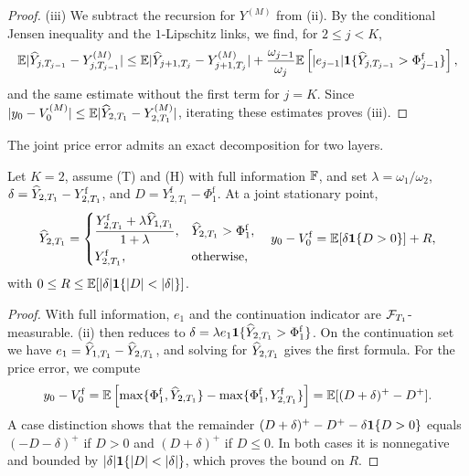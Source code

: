 \begin{proof}
(iii) We subtract the recursion for $Y^{(M)}$ from (ii). By the conditional Jensen inequality and the $1$-Lipschitz links, we find, for $2\le j<K$,
\[
\mathbb{E}\lvert \widehat Y_{j,T_{j-1}}-Y^{(M)}_{j,T_{j-1}}\rvert\le\mathbb{E}\lvert \widehat Y_{j+1,T_j}-Y^{(M)}_{j+1,T_j}\rvert+\frac{\omega_{j-1}}{\omega_j}\mathbb{E}\left[\lvert e_{j-1}\rvert\mathbf{1}\{\widehat Y_{j,T_{j-1}}>\Phi^{\mathrm f}_{j-1}\}\right],
\]
and the same estimate without the first term for $j=K$. Since $\lvert y_0-V^{(M)}_0\rvert\le\mathbb{E}\lvert \widehat Y_{2,T_1}-Y^{(M)}_{2,T_1}\rvert$, iterating these estimates proves (iii).
\end{proof}

The joint price error admits an exact decomposition for two layers.

\begin{proposition}\label{prop:twolayer}
Let $K=2$, assume (T) and (H) with full information $\mathbb{F}$, and set $\lambda=\omega_1/\omega_2$, $\delta=\widehat Y_{2,T_1}-Y^{\mathrm f}_{2,T_1}$, and $D=Y^{\mathrm f}_{2,T_1}-\Phi^{\mathrm f}_1$. At a joint stationary point,
\[
\widehat Y_{2,T_1}=\begin{cases}\dfrac{Y^{\mathrm f}_{2,T_1}+\lambda\widehat Y_{1,T_1}}{1+\lambda},&\widehat Y_{2,T_1}>\Phi^{\mathrm f}_1,\\[6pt] Y^{\mathrm f}_{2,T_1},&\text{otherwise},\end{cases}
\quad
y_0-V^{\mathrm f}_0=\mathbb{E}[\delta\mathbf{1}\{D>0\}]+R,
\]
with $0\le R\le\mathbb{E}[\lvert \delta\rvert\mathbf{1}\{\lvert D\rvert<\lvert \delta\rvert\}]$.
\end{proposition}

\begin{proof}
With full information, $e_1$ and the continuation indicator are $\mathcal{F}_{T_1}$-measurable. (ii) then reduces to $\delta=\lambda e_1\mathbf{1}\{\widehat Y_{2,T_1}>\Phi^{\mathrm f}_1\}$. On the continuation set we have $e_1=\widehat Y_{1,T_1}-\widehat Y_{2,T_1}$, and solving for $\widehat Y_{2,T_1}$ gives the first formula. For the price error, we compute
\[
y_0-V^{\mathrm f}_0=\mathbb{E}\left[\max\{\Phi^{\mathrm f}_1,\widehat Y_{2,T_1}\}-\max\{\Phi^{\mathrm f}_1,Y^{\mathrm f}_{2,T_1}\}\right]=\mathbb{E}[(D+\delta)^+-D^+].
\]
A case distinction shows that the remainder $(D+\delta)^+-D^+-\delta\mathbf{1}\{D>0\}$ equals $(-D-\delta)^+$ if $D>0$ and $(D+\delta)^+$ if $D\le0$. In both cases it is nonnegative and bounded by $\lvert \delta\rvert\mathbf{1}\{\lvert D\rvert<\lvert \delta\rvert\}$, which proves the bound on $R$.
\end{proof}

